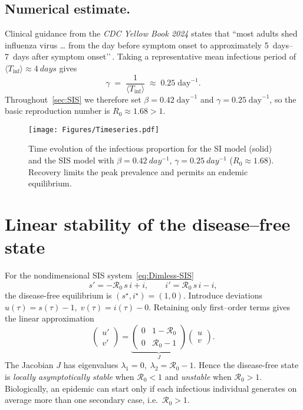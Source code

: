 \documentclass[11pt]{article}
\newcommand{\RR}{\mathcal{R}_0}
\begin{document}
\subsection*{Numerical estimate.}
Clinical guidance from the \emph{CDC Yellow Book 2024} states that
“most adults shed influenza virus … from the day before symptom onset
to approximately \SIrange{5}{7}{days} after symptom onset’’\,\citep{cdcYellowBook2024}.
Taking a representative mean infectious period of
\(\langle T_{\mathrm{inf}}\rangle \approx \SI{4}{days}\)
gives
\[
  \gamma \;=\; \frac{1}{\langle T_{\mathrm{inf}}\rangle}
  \;\approx\; 0.25\;\text{day}^{-1}.
\]
Throughout~\cref{sec:SIS} we therefore set
\(\beta = 0.42\;\text{day}^{-1}\) and \(\gamma = 0.25\;\text{day}^{-1}\),
so the basic reproduction number is \(R_0 \approx 1.68>1\).
\begin{figure}[H]
  \centering
  \texttt{[image: Figures/Timeseries.pdf]}
  \caption{Time evolution of the infectious proportion for the SI model
           (solid) and the SIS model with
           $\beta=\SI{0.42}{day^{-1}}$, $\gamma=\SI{0.25}{day^{-1}}$
           ($R_0\approx1.68$).  Recovery limits the peak prevalence and
           permits an endemic equilibrium.}
  \label{fig:timeseries}
\end{figure}
\section{Linear stability of the disease--free state}\label{sec:DFE-stability}

For the nondimensional SIS system~\cref{eq:Dimless-SIS}
\[
s' = -\RR\,s\,i+i,
\qquad
i' = \RR\,s\,i-i,
\]
the disease-free equilibrium is  $(s^{\star},i^{\star})=(1,0)$.
Introduce deviations
\(
u(\tau)=s(\tau)-1,\;
v(\tau)=i(\tau)-0.
\)
Retaining only first–order terms gives the linear approximation
\begin{equation*}
\begin{pmatrix}u'\\ v'\end{pmatrix}
=
\underbrace{\begin{pmatrix}
0 & 1-\RR\\[4pt]
0 & \RR-1
\end{pmatrix}}_{J}
\begin{pmatrix}u\\ v\end{pmatrix}.
\end{equation*}
The Jacobian $J$ has eigenvalues
\(
\lambda_{1}=0,\;
\lambda_{2}=\RR-1.
\)
Hence the disease-free state is
\emph{locally asymptotically stable} when $\RR<1$ and
\emph{unstable} when $\RR>1$.
Biologically, an epidemic can start only if each infectious
individual generates on average more than one secondary case,
i.e.\ $\RR>1$.
\end{document}
